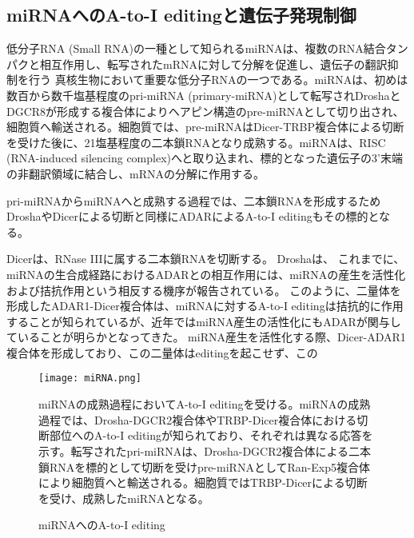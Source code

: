 \subsection{miRNAへのA-to-I editingと遺伝子発現制御}
低分子RNA (Small RNA)の一種として知られるmiRNAは、複数のRNA結合タンパクと相互作用し、転写されたmRNAに対して分解を促進し、遺伝子の翻訳抑制を行う
真核生物において重要な低分子RNAの一つである。miRNAは、初めは数百から数千塩基程度のpri-miRNA (primary-miRNA)として転写されDroshaとDGCR8が形成する複合体によりヘアピン構造のpre-miRNAとして切り出され、細胞質へ輸送される。細胞質では、pre-miRNAはDicer-TRBP複合体による切断を受けた後に、21塩基程度の二本鎖RNAとなり成熟する。miRNAは、RISC (RNA-induced silencing complex)へと取り込まれ、標的となった遺伝子の3'末端の非翻訳領域に結合し、mRNAの分解に作用する。
\par
pri-miRNAからmiRNAへと成熟する過程では、二本鎖RNAを形成するためDroshaやDicerによる切断と同様にADARによるA-to-I editingもその標的となる。

Dicerは、RNase IIIに属する二本鎖RNAを切断する。
Droshaは、
これまでに、miRNAの生合成経路におけるADARとの相互作用には、miRNAの産生を活性化および拮抗作用という相反する機序が報告されている。
このように、二量体を形成したADAR1-Dicer複合体は、miRNAに対するA-to-I editingは拮抗的に作用することが知られているが、近年ではmiRNA産生の活性化にもADARが関与していることが明らかとなってきた。
miRNA産生を活性化する際、Dicer-ADAR1複合体を形成しており、この二量体はeditingを起こせず、この

\begin{figure}[!htbp]
	\begin{center}
		\texttt{[image: miRNA.png]}
	\end{center}
	\caption{miRNAへのA-to-I editing}
	\begin{flushleft}
		\small{miRNAの成熟過程においてA-to-I editingを受ける。miRNAの成熟過程では、Drosha-DGCR2複合体やTRBP-Dicer複合体における切断部位へのA-to-I editingが知られており、それぞれは異なる応答を示す。転写されたpri-miRNAは、Drosha-DGCR2複合体による二本鎖RNAを標的として切断を受けpre-miRNAとしてRan-Exp5複合体により細胞質へと輸送される。細胞質ではTRBP-Dicerによる切断を受け、成熟したmiRNAとなる。}
	\end{flushleft}
	\label{fig:miRNA}
\end{figure}

